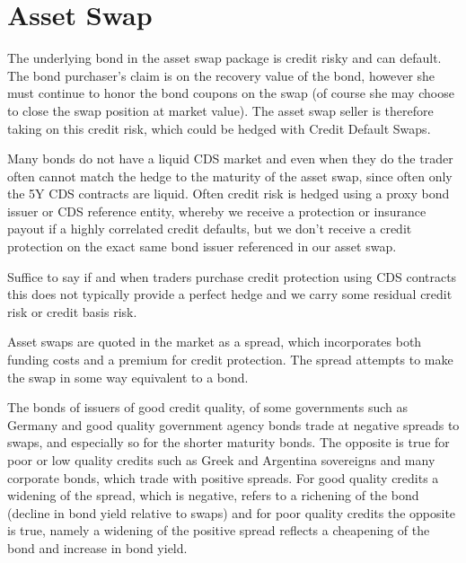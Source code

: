 \documentclass[12pt,a4paper]{article}
\begin{document}
\clearpage
\section{Asset Swap}

The underlying bond in the asset swap package is credit risky and can default. The bond purchaser’s claim is on the recovery value of the bond, however she must continue to honor the bond coupons on the swap (of course she may choose to close the swap position at market value). The asset swap seller is therefore taking on this credit risk, which could be hedged with Credit Default Swaps.

Many bonds do not have a liquid CDS market and even when they do the trader often cannot match the hedge to the maturity of the asset swap, since often only the 5Y CDS contracts are liquid. Often credit risk is hedged using a proxy bond issuer or CDS reference entity, whereby we receive a protection or insurance payout if a highly correlated credit defaults, but we don’t receive a credit protection on the exact same bond issuer referenced in our asset swap.

Suffice to say if and when traders purchase credit protection using CDS contracts this does not typically provide a perfect hedge and we carry some residual credit risk or credit basis risk.

Asset swaps are quoted in the market as a spread, which incorporates both funding costs and a premium for credit protection. The spread attempts to make the swap in some way equivalent to a bond.

The bonds of issuers of good credit quality, of some governments such as Germany and good quality government agency bonds trade at negative spreads to swaps, and especially so for the shorter maturity bonds. The opposite is true for poor or low quality credits such as Greek and Argentina sovereigns and many corporate bonds, which trade with positive spreads. For good quality credits a widening of the spread, which is negative, refers to a richening of the bond (decline in bond yield relative to swaps) and for poor quality credits the opposite is true, namely a widening of the positive spread reflects a cheapening of the bond and increase in bond yield.
\end{document}
